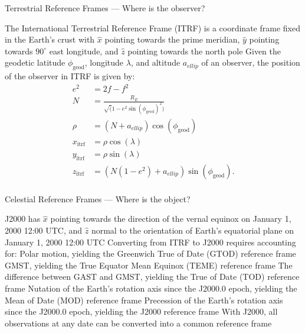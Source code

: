 \documentclass{beamer}
\begin{document}
\begin{frame}{Terrestrial Reference Frames --- Where is the observer?}
    \begin{outline}
        \1 The International Terrestrial Reference Frame (ITRF) is a coordinate frame fixed in the Earth's crust with $\hat{x}$ pointing towards the prime meridian, $\hat{y}$ pointing towards $90^\circ$ east longitude, and $\hat{z}$ pointing towards the north pole
        \1 Given the geodetic latitude $\phi_\mathrm{geod}$, longitude $\lambda$, and altitude $a_{ellip}$ of an observer, the position of the observer in ITRF is given by:
        \begin{align*}
            e^2 &= 2f - f^2 \\
            N &= \frac{R_E}{\sqrt(1 - e^2 \sin(\phi_\mathrm{geod})^2)} \\
            \rho &= (N + a_{ellip}) \cos(\phi_\mathrm{geod}) \\
            x_\mathrm{itrf} &= \rho \cos(\lambda) \\
            y_\mathrm{itrf} &= \rho \sin(\lambda) \\
            z_\mathrm{itrf} &= \left(N (1 - e^2) + a_{ellip} \right) \sin(\phi_\mathrm{geod}). \\          
        \end{align*}
    \end{outline}
\end{frame}

\begin{frame}{Celestial Reference Frames --- Where is the object?}
    \begin{outline}
        \1 J2000 has $\hat{x}$ pointing towards the direction of the vernal equinox on January 1, 2000 12:00 UTC, and $\hat{z}$ normal to the orientation of Earth's equatorial plane on January 1, 2000 12:00 UTC
        \1 Converting from ITRF to J2000 requires accounting for:
        \2 Polar motion, yielding the Greenwich True of Date (GTOD) reference frame
        \2 GMST, yielding the True Equator Mean Equinox (TEME) reference frame
        \2 The difference between GAST and GMST, yielding the True of Date (TOD) reference frame
        \2 Nutation of the Earth's rotation axis since the J2000.0 epoch, yielding the Mean of Date (MOD) reference frame
        \2 Precession of the Earth's rotation axis since the J2000.0 epoch, yielding the J2000 reference frame
        \1 With J2000, all observations at any date can be converted into a common reference frame
    \end{outline}
\end{frame}
\end{document}
